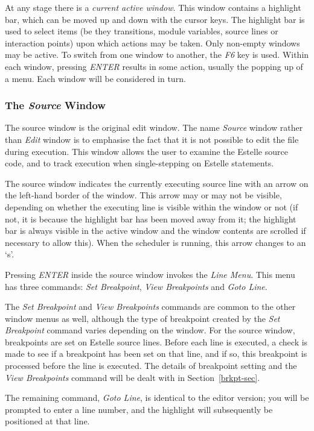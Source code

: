 At any stage there is a {\em current active window}. This window
contains a highlight bar, which can be moved up and down with the
cursor keys. The highlight bar is used to select items (be they
transitions, module variables, source lines or interaction points)
upon which actions may be taken. Only non-empty windows may be
active. To switch from one window to another, the {\em F6} key is
used. Within each window, pressing {\em ENTER} results in some
action, usually the popping up of a menu. Each window will be
considered in turn.

\subsubsection[The {\em Source} Window]{The {\em Source} Window}

The source window is the original edit window. The name {\em Source}
window rather than {\em Edit} window is to emphasise the fact that
it is not possible to edit the file during execution.
This window allows the user to examine the
Estelle source code, and to track execution when single-stepping on
Estelle statements.

The source window indicates the currently executing source line with
an arrow on the left-hand border of the window. This arrow may or may
not be visible, depending on whether the executing line  is visible
within the window or not (if not, it is because the highlight bar has
been moved away from it; the highlight bar is always visible in the
active window and the window contents are scrolled if necessary to
allow this). When the scheduler is running, this arrow changes to an
`s'.

Pressing {\em ENTER} inside the source window invokes the {\em Line
Menu}. This menu has three commands: {\em Set Breakpoint}, {\em View
Breakpoints} and {\em Goto Line}.

The {\em Set Breakpoint} and {\em View Breakpoints} commands are
common to the other window menus as well, although the type of
breakpoint created by the {\em Set Breakpoint} command varies
depending on the window. For the source window, breakpoints are set
on Estelle source lines. Before each line is executed, a check is
made to see if a breakpoint has been set on that line, and if so,
this breakpoint is processed before the line is executed. The details
of breakpoint setting and the {\em View Breakpoints} command will be
dealt with in Section~\ref{brkpt-sec}.

The remaining command, {\em Goto Line}, is identical to the editor
version; you will be prompted to enter a line number, and the
highlight will subsequently be positioned at that line.

